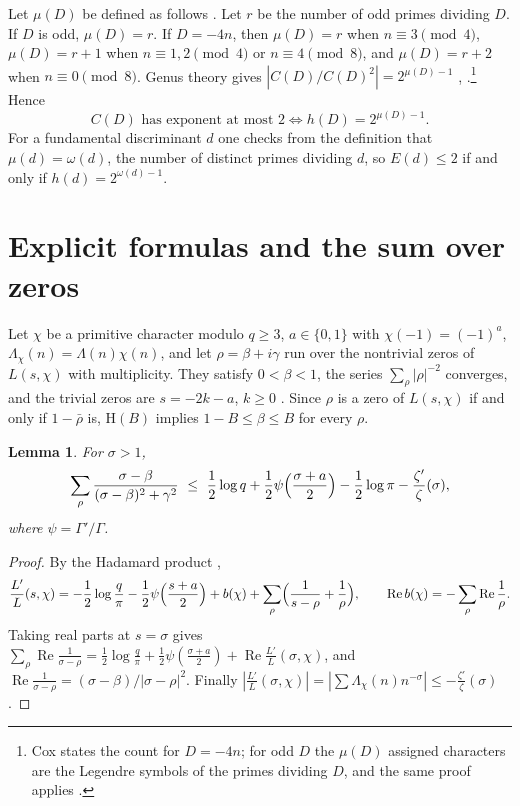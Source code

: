 \documentclass[11pt]{amsart}
\newtheorem{lemma}[theorem]{Lemma}
\theoremstyle{definition}
\theoremstyle{remark}
\numberwithin{equation}{section}
\renewcommand{\Re}{\operatorname{Re}}
\newcommand{\Lam}{\Lambda_\chi}
\newcommand{\Hyp}{\mathrm{H}}
\begin{document}
Let $\mu(D)$ be defined as follows \cite[Proposition 3.11]{Cox13}. Let $r$ be the number of odd primes dividing $D$. If $D$ is odd, $\mu(D)=r$. If $D=-4n$, then $\mu(D)=r$ when $n\equiv3\pmod4$, $\mu(D)=r+1$ when $n\equiv1,2\pmod4$ or $n\equiv4\pmod8$, and $\mu(D)=r+2$ when $n\equiv0\pmod8$. Genus theory gives $|C(D)/C(D)^2|=2^{\mu(D)-1}$ \cite[Theorem 3.15]{Cox13}, \cite[Chapter 4]{Bue89}.\footnote{Cox states the count for $D=-4n$; for odd $D$ the $\mu(D)$ assigned characters are the Legendre symbols of the primes dividing $D$, and the same proof applies \cite{Bue89}.} Hence
\begin{equation}\label{eq:genus}
C(D)\text{ has exponent at most }2\iff h(D)=2^{\mu(D)-1}.
\end{equation}
For a fundamental discriminant $d$ one checks from the definition that $\mu(d)=\omega(d)$, the number of distinct primes dividing $d$, so $E(d)\le 2$ if and only if $h(d)=2^{\omega(d)-1}$.

\section{Explicit formulas and the sum over zeros}\label{sec:explicit}

Let $\chi$ be a primitive character modulo $q\ge3$, $a\in\{0,1\}$ with $\chi(-1)=(-1)^a$, $\Lam(n)=\Lambda(n)\chi(n)$, and let $\rho=\beta+i\gamma$ run over the nontrivial zeros of $L(s,\chi)$ with multiplicity. They satisfy $0<\beta<1$, the series $\sum_\rho|\rho|^{-2}$ converges, and the trivial zeros are $s=-2k-a$, $k\ge0$ \cite[Chapters 9 and 12]{Dav80}. Since $\rho$ is a zero of $L(s,\chi)$ if and only if $1-\bar\rho$ is, $\Hyp(B)$ implies $1-B\le\beta\le B$ for every $\rho$.

\begin{lemma}\label{lem:hadamard}
For $\sigma>1$,
\[
\sum_\rho\frac{\sigma-\beta}{(\sigma-\beta)^2+\gamma^2}\ \le\ \frac12\log q+\frac12\psi\Bigl(\frac{\sigma+a}2\Bigr)-\frac12\log\pi-\frac{\zeta'}{\zeta}(\sigma),
\]
where $\psi=\Gamma'/\Gamma$.
\end{lemma}

\begin{proof}
By the Hadamard product \cite[Chapter 12]{Dav80},
\[
\frac{L'}{L}(s,\chi)=-\frac12\log\frac q\pi-\frac12\psi\Bigl(\frac{s+a}2\Bigr)+b(\chi)+\sum_\rho\Bigl(\frac1{s-\rho}+\frac1\rho\Bigr),\qquad \Re b(\chi)=-\sum_\rho\Re\frac1\rho .
\]
Taking real parts at $s=\sigma$ gives
$\sum_\rho\Re\frac1{\sigma-\rho}=\frac12\log\frac q\pi+\frac12\psi(\frac{\sigma+a}2)+\Re\frac{L'}{L}(\sigma,\chi)$, and $\Re\frac1{\sigma-\rho}=(\sigma-\beta)/|\sigma-\rho|^2$. Finally $|\frac{L'}{L}(\sigma,\chi)|=|\sum\Lam(n)n^{-\sigma}|\le-\frac{\zeta'}{\zeta}(\sigma)$.
\end{proof}
\end{document}
